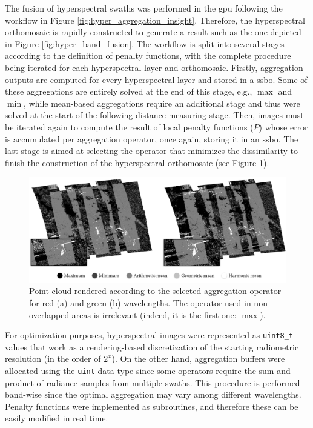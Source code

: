The fusion of hyperspectral swaths was performed in the \acrshort{gpu} following the workflow in Figure \ref{fig:hyper_aggregation_insight}. Therefore, the hyperspectral orthomosaic is rapidly constructed to generate a result such as the one depicted in Figure \ref{fig:hyper_band_fusion}. The workflow is split into several stages according to the definition of penalty functions, with the complete procedure being iterated for each hyperspectral layer and orthomosaic. Firstly, aggregation outputs are computed for every hyperspectral layer and stored in a \acrshort{ssbo}. Some of these aggregations are entirely solved at the end of this stage, e.g., $\max$ and $\min$, while mean-based aggregations require an additional stage and thus were solved at the start of the following distance-measuring stage. Then, images must be iterated again to compute the result of local penalty functions ($P$) whose error is accumulated per aggregation operator, once again, storing it in an \acrshort{ssbo}. The last stage is aimed at selecting the operator that minimizes the dissimilarity to finish the construction of the hyperspectral orthomosaic (see Figure \ref{fig:hyper_aggregation_selection}). 

\begin{figure}[bt]
    \centering
    \includegraphics[width=\linewidth]{figs/hyper_point_cloud/aggregation_selection.png}
	\caption{Point cloud rendered according to the selected aggregation operator for red (a) and green (b) wavelengths. The operator used in non-overlapped areas is irrelevant (indeed, it is the first one: $\max$). }
	\label{fig:hyper_aggregation_selection}
\end{figure}

For optimization purposes, hyperspectral images were represented as \verb|uint8_t| values that work as a rendering-based discretization of the starting radiometric resolution (in the order of $2^x$). On the other hand, aggregation buffers were allocated using the \verb|uint| data type since some operators require the sum and product of radiance samples from multiple swaths. This procedure is performed band-wise since the optimal aggregation may vary among different wavelengths. Penalty functions were implemented as subroutines, and therefore these can be easily modified in real time.

